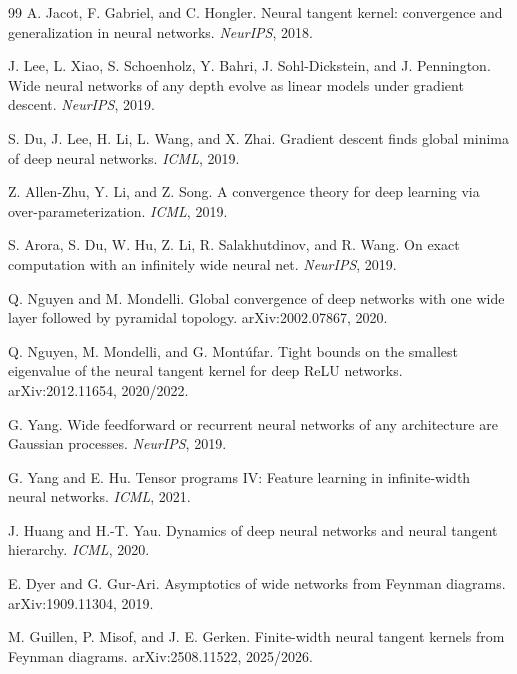 \documentclass{article}
\begin{document}
\begin{thebibliography}{99}
A. Jacot, F. Gabriel, and C. Hongler.
\newblock Neural tangent kernel: convergence and generalization in neural networks.
\newblock \emph{NeurIPS}, 2018.

J. Lee, L. Xiao, S. Schoenholz, Y. Bahri, J. Sohl-Dickstein, and J. Pennington.
\newblock Wide neural networks of any depth evolve as linear models under gradient descent.
\newblock \emph{NeurIPS}, 2019.

S. Du, J. Lee, H. Li, L. Wang, and X. Zhai.
\newblock Gradient descent finds global minima of deep neural networks.
\newblock \emph{ICML}, 2019.

Z. Allen-Zhu, Y. Li, and Z. Song.
\newblock A convergence theory for deep learning via over-parameterization.
\newblock \emph{ICML}, 2019.

S. Arora, S. Du, W. Hu, Z. Li, R. Salakhutdinov, and R. Wang.
\newblock On exact computation with an infinitely wide neural net.
\newblock \emph{NeurIPS}, 2019.

Q. Nguyen and M. Mondelli.
\newblock Global convergence of deep networks with one wide layer followed by pyramidal topology.
\newblock arXiv:2002.07867, 2020.

Q. Nguyen, M. Mondelli, and G. Montúfar.
\newblock Tight bounds on the smallest eigenvalue of the neural tangent kernel for deep ReLU networks.
\newblock arXiv:2012.11654, 2020/2022.

G. Yang.
\newblock Wide feedforward or recurrent neural networks of any architecture are Gaussian processes.
\newblock \emph{NeurIPS}, 2019.

G. Yang and E. Hu.
\newblock Tensor programs IV: Feature learning in infinite-width neural networks.
\newblock \emph{ICML}, 2021.

J. Huang and H.-T. Yau.
\newblock Dynamics of deep neural networks and neural tangent hierarchy.
\newblock \emph{ICML}, 2020.

E. Dyer and G. Gur-Ari.
\newblock Asymptotics of wide networks from Feynman diagrams.
\newblock arXiv:1909.11304, 2019.

M. Guillen, P. Misof, and J. E. Gerken.
\newblock Finite-width neural tangent kernels from Feynman diagrams.
\newblock arXiv:2508.11522, 2025/2026.


\end{thebibliography}
\end{document}
